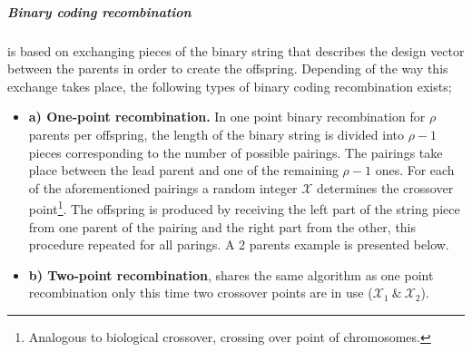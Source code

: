 \subparagraph{Binary coding recombination} is based on exchanging pieces of the binary string that describes the design vector between the parents in order to create the offspring. Depending of the way this exchange takes place, the following types of binary coding recombination exists;
\begin{itemize}
\item[]{\bf a) One-point recombination.} 
In one point binary recombination for $\rho$ parents per offspring, the length of the binary string is divided into $\rho-1$ pieces corresponding to the number of possible pairings. The pairings take place between the lead parent and one of the remaining $\rho-1$ ones. For each of the aforementioned pairings a random integer $\mathcal{X}$ determines the crossover point\footnote{Analogous to biological crossover, crossing over point of chromosomes.}. The offspring is produced by receiving the left part of the string piece from one parent of the pairing and the right part from the other, this procedure repeated for all parings. A 2 parents example is presented below.
\begin{figure}[h!]
\begin{minipage}[b]{1.0\linewidth}
 \centering
\end{minipage}
\label{onepX}
\end{figure}
\pagebreak    
\item[]{\bf b) Two-point recombination}, shares the same algorithm as one point recombination only this time two crossover points are in use ($\mathcal{X}_1~\&~\mathcal{X}_2$).

\begin{figure}[h!]
\begin{minipage}[b]{1.0\linewidth}
 \centering
\end{minipage}
\label{onepX}
\end{figure}


\end{itemize}

